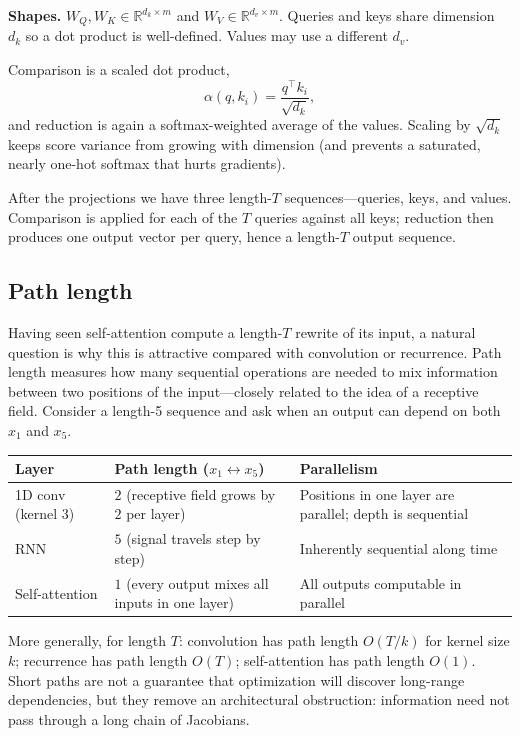 \documentclass[11pt]{article}
\begin{document}
\noindent\textbf{Shapes.}
\(W_Q,W_K\in\mathbb{R}^{d_k\times m}\) and \(W_V\in\mathbb{R}^{d_v\times m}\).
Queries and keys share dimension \(d_k\) so a dot product is well-defined.
Values may use a different \(d_v\).

Comparison is a scaled dot product,
\[
  \alpha(q,k_i)=\frac{q^\top k_i}{\sqrt{d_k}},
\]
and reduction is again a softmax-weighted average of the values. Scaling by
\(\sqrt{d_k}\) keeps score variance from growing with dimension (and
prevents a saturated, nearly one-hot softmax that hurts gradients).

After the projections we have three length-\(T\) sequences---queries, keys,
and values. Comparison is applied for each of the \(T\) queries against all
keys; reduction then produces one output vector per query, hence a
length-\(T\) output sequence.

\subsection{Path length}


Having seen self-attention compute a length-\(T\) rewrite of its input,
a natural question is why this is attractive compared with convolution or
recurrence. Path length measures how many sequential operations are needed to mix
information between two positions of the input---closely related to the
idea of a receptive field. Consider a length-5 sequence and ask when an
output can depend on both \(x_1\) and \(x_5\).

\begin{center}
\begin{tabular}{@{}lll@{}}
\toprule
Layer & Path length (\(x_1\leftrightarrow x_5\)) & Parallelism \\
\midrule
1D conv (kernel \(3\))
  & \(2\) (receptive field grows by \(2\) per layer)
  & Positions in one layer are parallel; depth is sequential \\
RNN
  & \(5\) (signal travels step by step)
  & Inherently sequential along time \\
Self-attention
  & \(1\) (every output mixes all inputs in one layer)
  & All outputs computable in parallel \\
\bottomrule
\end{tabular}
\end{center}

More generally, for length \(T\): convolution has path length
\(O(T/k)\) for kernel size \(k\); recurrence has path length \(O(T)\);
self-attention has path length \(O(1)\). Short paths are not a guarantee
that optimization will discover long-range dependencies, but they remove
an architectural obstruction: information need not pass through a long
chain of Jacobians.
\end{document}
